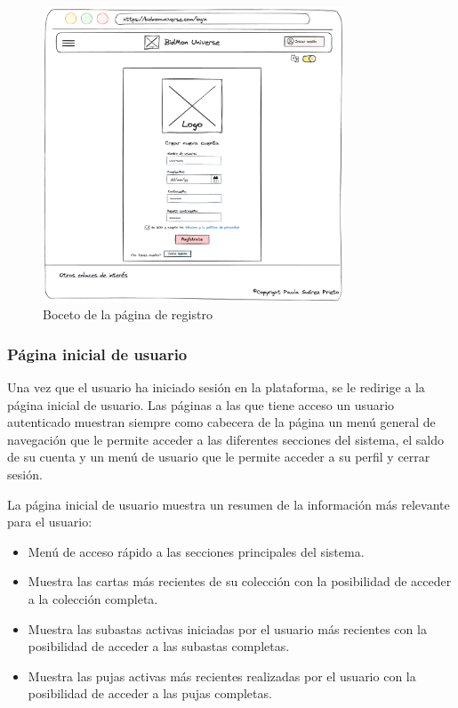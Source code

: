 \begin{figure}[H]
    \centering
    \includegraphics[width=0.8\textwidth]{figures/6-Analisis/6-Interfaz/prototipos/signup.png}
    \caption{Boceto de la página de registro}
    \label{fig:p_signup}
    \hypertarget{fig:p_signup}{}
\end{figure}

\subsubsection{Página inicial de usuario}
Una vez que el usuario ha iniciado sesión en la plataforma, se le redirige a la página inicial de usuario.
Las páginas a las que tiene acceso un usuario autenticado muestran siempre como cabecera de la página un menú general de navegación que le permite acceder a las diferentes secciones del sistema,
el saldo de su cuenta y un menú de usuario que le permite acceder a su perfil y cerrar sesión.

La página inicial de usuario muestra un resumen de la información más relevante para el usuario:
\begin{itemize}
    \item Menú de acceso rápido a las secciones principales del sistema.
    \item Muestra las cartas más recientes de su colección con la posibilidad de acceder a la colección completa.
    \item Muestra las subastas activas iniciadas por el usuario más recientes con la posibilidad de acceder a las subastas completas.
    \item Muestra las pujas activas más recientes realizadas por el usuario con la posibilidad de acceder a las pujas completas.
\end{itemize}

